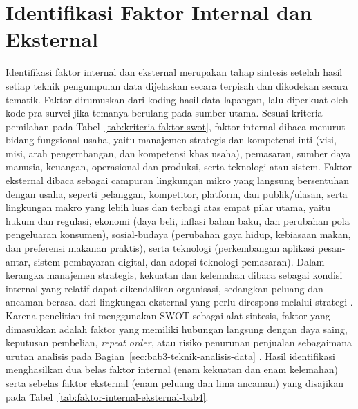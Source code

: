 \section{Identifikasi Faktor Internal dan Eksternal}
Identifikasi faktor internal dan eksternal merupakan tahap sintesis setelah hasil setiap teknik pengumpulan data dijelaskan secara terpisah dan dikodekan secara tematik. Faktor dirumuskan dari koding hasil data lapangan, lalu diperkuat oleh kode pra-survei jika temanya berulang pada sumber utama. Sesuai kriteria pemilahan pada Tabel~\ref{tab:kriteria-faktor-swot}, faktor internal dibaca menurut bidang fungsional usaha, yaitu manajemen strategis dan kompetensi inti (visi, misi, arah pengembangan, dan kompetensi khas usaha), pemasaran, sumber daya manusia, keuangan, operasional dan produksi, serta teknologi atau sistem. Faktor eksternal dibaca sebagai campuran lingkungan mikro yang langsung bersentuhan dengan usaha, seperti pelanggan, kompetitor, platform, dan publik/ulasan, serta lingkungan makro yang lebih luas dan terbagi atas empat pilar utama, yaitu hukum dan regulasi, ekonomi (daya beli, inflasi bahan baku, dan perubahan pola pengeluaran konsumen), sosial-budaya (perubahan gaya hidup, kebiasaan makan, dan preferensi makanan praktis), serta teknologi (perkembangan aplikasi pesan-antar, sistem pembayaran digital, dan adopsi teknologi pemasaran). Dalam kerangka manajemen strategis, kekuatan dan kelemahan dibaca sebagai kondisi internal yang relatif dapat dikendalikan organisasi, sedangkan peluang dan ancaman berasal dari lingkungan eksternal yang perlu direspons melalui strategi \parencite{david2023strategicmanagement,gurel2017swot}. Karena penelitian ini menggunakan SWOT sebagai alat sintesis, faktor yang dimasukkan adalah faktor yang memiliki hubungan langsung dengan daya saing, keputusan pembelian, \textit{repeat order}, atau risiko penurunan penjualan sebagaimana urutan analisis pada Bagian~\ref{sec:bab3-teknik-analisis-data} \parencite{rangkuti2016analisisSWOT}. Hasil identifikasi menghasilkan dua belas faktor internal (enam kekuatan dan enam kelemahan) serta sebelas faktor eksternal (enam peluang dan lima ancaman) yang disajikan pada Tabel~\ref{tab:faktor-internal-eksternal-bab4}.

